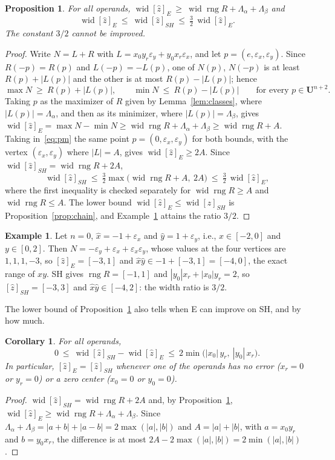 \documentclass[11pt]{article}
\newtheorem{propo}{Proposition}
\newtheorem{corollary}{Corollary}
\theoremstyle{definition}
\newtheorem{example}{Example}
\newcommand{\U}{\mathbf{U}}
\newcommand{\eps}{\varepsilon}
\newcommand{\ex}{\eps_x}
\newcommand{\ey}{\eps_y}
\newcommand{\rng}{\operatorname{rng}}
\newcommand{\wid}{\operatorname{wid}}
\begin{document}
\begin{propo}
\label{prop:32}
For all operands, $\wid[\hat z]_E\ \ge\ \wid\rng R+\Lambda_\alpha+\Lambda_\beta$ and
\[
\wid[\hat z]_E\ \le\ \wid[\hat z]_{SH}\ \le\ \tfrac32\,\wid[\hat z]_E .
\]
The constant $3/2$ cannot be improved.
\end{propo}
\begin{proof}
Write $N=L+R$ with $L=x_0y_r\ey+y_0x_r\ex$, and let $p=(e,\ex,\ey)$. Since $R(-p)=R(p)$ and $L(-p)=-L(p)$, one of $N(p)$, $N(-p)$ is at least $R(p)+|L(p)|$ and the other is at most $R(p)-|L(p)|$; hence
\begin{equation}
\label{eq:pm}
\max N\ \ge\ R(p)+|L(p)|,\qquad \min N\ \le\ R(p)-|L(p)|\qquad\text{for every } p\in\U^{n+2}.
\end{equation}
Taking $p$ as the maximizer of $R$ given by Lemma~\ref{lem:classes}, where $|L(p)|=\Lambda_\alpha$, and then as its minimizer, where $|L(p)|=\Lambda_\beta$, gives $\wid[\hat z]_E=\max N-\min N\ge\wid\rng R+\Lambda_\alpha+\Lambda_\beta\ge\wid\rng R+A$. Taking in~\eqref{eq:pm} the same point $p=(0,\ex,\ey)$ for both bounds, with the vertex $(\ex,\ey)$ where $|L|=A$, gives $\wid[\hat z]_E\ge 2A$. Since $\wid[\hat z]_{SH}=\wid\rng R+2A$,
\[
\wid[\hat z]_{SH}\ \le\ \tfrac32\max\big(\wid\rng R+A,\ 2A\big)\ \le\ \tfrac32\,\wid[\hat z]_E ,
\]
where the first inequality is checked separately for $\wid\rng R\ge A$ and $\wid\rng R\le A$. The lower bound $\wid[\hat z]_E\le\wid[\hat z]_{SH}$ is Proposition~\ref{prop:chain}, and Example~\ref{ex:32} attains the ratio $3/2$.
\end{proof}

\begin{example}
\label{ex:32}
Let $n=0$, $\hat x = -1+\ex$ and $\hat y = 1+\ey$, i.e., $x\in[-2,0]$ and $y\in[0,2]$. Then $N = -\ey+\ex+\ex\ey$, whose values at the four vertices are $1,1,1,-3$, so $[\hat z]_E=[-3,1]$ and $\hat x\hat y\in -1+[-3,1]=[-4,0]$, the exact range of $xy$. SH gives $\rng R=[-1,1]$ and $|y_0|x_r+|x_0|y_r = 2$, so $[\hat z]_{SH}=[-3,3]$ and $\hat x\hat y\in[-4,2]$: the width ratio is $3/2$.
\end{example}

The lower bound of Proposition~\ref{prop:32} also tells when E can improve on SH, and by how much.

\begin{corollary}
\label{cor:gain}
For all operands,
\[
0\ \le\ \wid[\hat z]_{SH}-\wid[\hat z]_E\ \le\ 2\min\big(|x_0|\,y_r,\ |y_0|\,x_r\big).
\]
In particular, $[\hat z]_E=[\hat z]_{SH}$ whenever one of the operands has no error ($x_r=0$ or $y_r=0$) or a zero center ($x_0=0$ or $y_0=0$).
\end{corollary}
\begin{proof}
$\wid[\hat z]_{SH}=\wid\rng R+2A$ and, by Proposition~\ref{prop:32}, $\wid[\hat z]_E\ge\wid\rng R+\Lambda_\alpha+\Lambda_\beta$. Since $\Lambda_\alpha+\Lambda_\beta = |a+b|+|a-b| = 2\max(|a|,|b|)$ and $A=|a|+|b|$, with $a=x_0y_r$ and $b=y_0x_r$, the difference is at most $2A-2\max(|a|,|b|)=2\min(|a|,|b|)$.
\end{proof}
\end{document}
